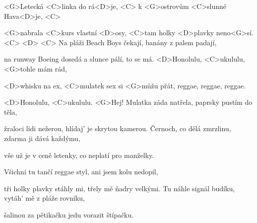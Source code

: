 

\zs

<G>Letecká <C>linka do rá<D>je, <C>
k <G>ostrovům <C>slunné Hava<D>je, <C>

<G>nabrala <C>kurs vlastní <D>osy,
<C>tam holky <D>plavky neno<G>sí. <C> <D> <C>
\ks
\zs
Na pláži Beach Boys čekají,
banány z palem padají,

na runway Boeing dosedá
a slunce pálí, to se má.
\ks
\zr
<D>Honolulu, <C>ukululu, <G>tohle mám rád,

<D>whisku na ex, <C>mulatek sex si <G>můžu přát,
reggae, reggae, reggae.

<D>Honolulu, <C>ukululu. <G>Hej!
\kr
\zs
Mulatka záda natřela,
paprsky pustím do těla,

žraloci lidi nežerou,
hlídaj' je skrytou kamerou.
\ks
\zs
Černoch, co dělá zmrzlinu,
zdarma ji dává každýmu,

vše už je v ceně letenky,
co neplatí pro manželky.
\ks

\zr
\kr

\zs
Všichni tu tančí reggae styl,
ani jsem kolu nedopil,

tři holky plavky stáhly mi,
třely mě ňadry velkými.
\ks
\zs
Tu náhle signál budíku,
vytáh' mě z pláže rovníku,

šalinou za pětikačku
jedu vorazit štípačku.
\ks

\zr
\kr

\kp
